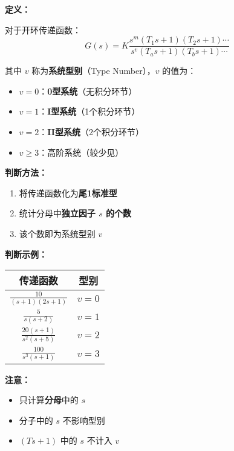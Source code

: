 \begin{minipage}[t]{0.54\textwidth}
\textbf{定义：}

对于开环传递函数：
$$G(s) = K \frac{s^m(T_1s+1)(T_2s+1)\cdots}{s^v(T_as+1)(T_bs+1)\cdots}$$

其中 $v$ 称为\textbf{系统型别}（Type Number），$v$ 的值为：
\begin{itemize}
    \item $v = 0$：\textbf{0型系统}（无积分环节）
    \item $v = 1$：\textbf{I型系统}（1个积分环节）
    \item $v = 2$：\textbf{II型系统}（2个积分环节）
    \item $v \geq 3$：高阶系统（较少见）
\end{itemize}

\vspace{0.2cm}
\textbf{判断方法：}
\begin{enumerate}
    \item 将传递函数化为\textbf{尾1标准型}
    \item 统计分母中\textbf{独立因子 $s$ 的个数}
    \item 该个数即为系统型别 $v$
\end{enumerate}
\end{minipage}\hfill
\begin{minipage}[t]{0.43\textwidth}
\vspace{0pt}
\textbf{判断示例：}

\begin{center}
\begin{tabular}{|c|c|}
\hline
\textbf{传递函数} & \textbf{型别} \\
\hline
$\displaystyle\frac{10}{(s+1)(2s+1)}$ & $v=0$ \\[0.3cm]
\hline
$\displaystyle\frac{5}{s(s+2)}$ & $v=1$ \\[0.3cm]
\hline
$\displaystyle\frac{20(s+1)}{s^2(s+5)}$ & $v=2$ \\[0.3cm]
\hline
$\displaystyle\frac{100}{s^3(s+1)}$ & $v=3$ \\[0.3cm]
\hline
\end{tabular}
\end{center}

\vspace{0.2cm}
\textbf{注意：}
\begin{itemize}
    \item 只计算\textbf{分母}中的 $s$
    \item 分子中的 $s$ 不影响型别
    \item $(Ts+1)$ 中的 $s$ 不计入 $v$
\end{itemize}
\end{minipage}

